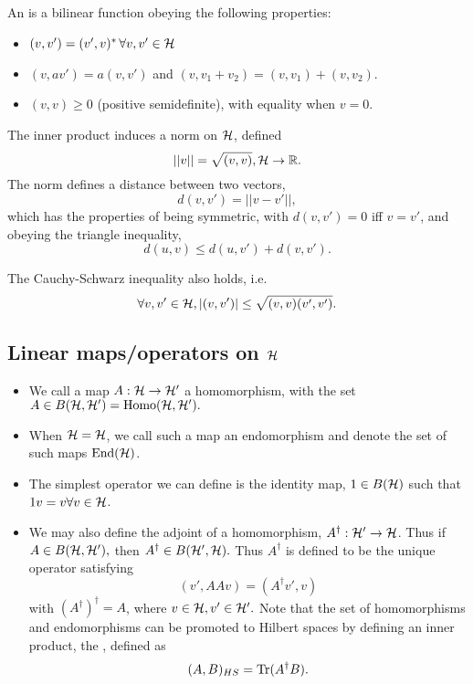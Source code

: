 \begin{defn}
    An  is a bilinear function obeying the following properties:
    \begin{itemize}
        \item $(v,v')=(v',v)^* \,\forall v,v' \in \mathcal H$
        \item $(v,av')=a(v,v')$ and $(v,v_1+v_2)=(v,v_1)+(v,v_2)$.
        \item $(v,v)\geq 0$  (positive semidefinite), with equality when $v=0.$
    \end{itemize}
\end{defn}
The inner product induces a norm on $\mathcal H$, defined
\begin{equation}
    ||v||=\sqrt{(v,v)}, \mathcal H \to \mathbb{R}.
\end{equation}
The norm defines a distance between two vectors,
\begin{equation}
    d(v,v')=||v-v'||,
\end{equation}
which has the properties of being symmetric, with $d(v,v')=0$ iff $v=v'$, and obeying the triangle inequality, 
\begin{equation}
    d(u,v) \leq d(u,v') + d(v,v').
\end{equation}

The Cauchy-Schwarz inequality also holds, i.e.
\begin{equation}
    \forall v, v' \in \mathcal H, |(v,v')|\leq \sqrt{(v,v) (v',v')}.
\end{equation}

\subsection*{Linear maps/operators on $\mathcal H$}
\begin{itemize}
    \item We call a map $A:\mathcal H \to \mathcal H'$ a homomorphism, with the set $A\in B(\mathcal H, \mathcal H')=\text{Homo}(\mathcal H, \mathcal H').$
    \item When $\mathcal H = \mathcal H$, we call such a map an endomorphism and denote the set of such maps $\text{End}(\mathcal H)$.
    \item The simplest operator we can define is the identity map, $1\in B(\mathcal H)$ such that $1v = v \forall v\in \mathcal H$.
    \item We may also define the adjoint of a homomorphism, $A^\dagger: \mathcal H' \to \mathcal H$. Thus if $A\in B(\mathcal H, \mathcal H'),$ then $A^\dagger \in B(\mathcal H',\mathcal H).$ Thus $A^\dagger$ is defined to be the unique operator satisfying
    \begin{equation}
        (v',AAv) = (A^\dagger v',v)
    \end{equation}
    with $(A^\dagger)^\dagger = A$, where $v\in \mathcal H, v' \in \mathcal H'.$ Note that the set of homomorphisms and endomorphisms can be promoted to Hilbert spaces by defining an inner product, the , defined as
    \begin{equation}
        (A,B)_{HS}=\operatorname{Tr}(A^\dagger B).
    \end{equation}
\end{itemize}

